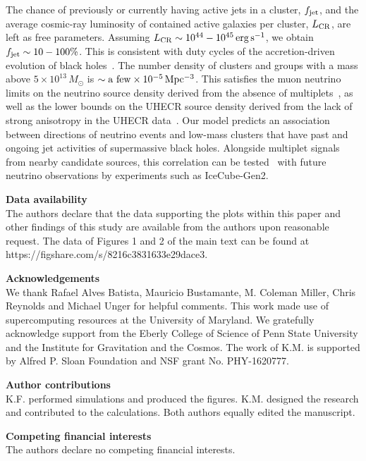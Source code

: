 \documentclass[aps,prd,onecolumn,superscriptaddress,11pt]{revtex4}
\begin{document}
The chance of previously or currently having active jets in a cluster, $f_{\rm jet}$, and the average cosmic-ray luminosity of contained active galaxies per cluster, $L_{\rm CR}$, are left as free parameters. Assuming $L_{\rm CR}\sim10^{44}-10^{45}\,\rm erg\,s^{-1}$, we obtain $f_{\rm jet}\sim10-100\%$. This is consistent with duty cycles of the accretion-driven evolution of black holes~\cite{2011ApJ...740...51M}. The number density of clusters and groups with a mass above $5\times10^{13}\,M_\odot$ is $\sim{\rm a~few}\times10^{-5}\,\rm Mpc^{-3}$. This satisfies the muon neutrino limits on the neutrino source density derived from the absence of multiplets~\cite{2016PhRvD..94j3006M}, as well as the lower bounds on the UHECR source density derived from the lack of strong anisotropy in the UHECR data~\cite{AugerBound}. 
Our model predicts an association between directions of neutrino events and low-mass clusters that have past and ongoing jet activities of supermassive black holes. Alongside multiplet signals from nearby candidate sources, this correlation can be tested~\cite{2016PhRvD..94j3006M} with future neutrino observations by experiments such as IceCube-Gen2.

\medskip
{\bf Data availability}\\
The authors declare that the data supporting the plots within this paper and other findings of this study are available from the authors upon reasonable request. The data of Figures 1 and 2 of the main text can be found at https://figshare.com/s/8216c3831633e29dace3.

{\bf Acknowledgements}\\
We thank Rafael Alves Batista, Mauricio Bustamante, M. Coleman Miller, Chris Reynolds and Michael Unger for helpful comments. 
This work made use of supercomputing resources at the University of Maryland. We gratefully acknowledge support from the Eberly College of Science of Penn State University and the Institute for Gravitation and the Cosmos. The work of K.M. is supported by Alfred P. Sloan Foundation and NSF grant No. PHY-1620777. 

{\bf Author contributions}\\
K.F. performed simulations and produced the figures. K.M. designed the research and contributed to the calculations. Both authors equally edited the manuscript.

{\bf Competing financial interests}\\
The authors declare no competing financial interests.
\end{document}
